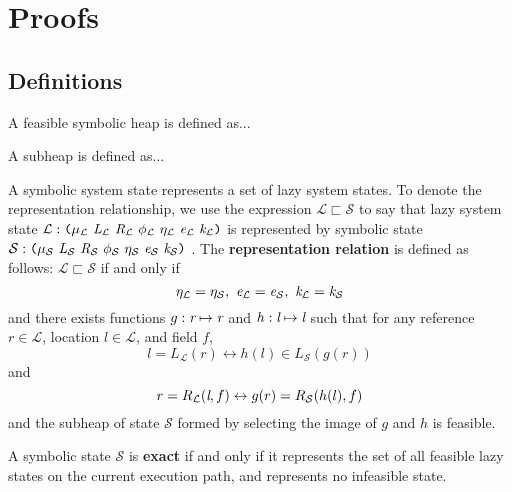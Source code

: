 \section{Proofs}

\subsection{Definitions}

\begin{definition}
A feasible symbolic heap is defined as...
\end{definition}

\begin{definition}
A subheap is defined as...
\end{definition}

\begin{definition}
A symbolic system state represents a set of lazy system states. To denote the representation relationship, we use the expression $\mathcal{L}\sqsubset \mathcal{S} $ to say that lazy system state $\mathcal{L}:\lp \mu_{\mathcal{L}}\ \cfgnt{L}_{\mathcal{L}}\ \cfgnt{R}_{\mathcal{L}}\ \phi_{\mathcal{L}}\ \eta_{\mathcal{L}}\ \cfgnt{e}_{\mathcal{L}}\ \cfgnt{k}_{\mathcal{L}}\rp$ is represented by symbolic state $\mathcal{S}:\lp \mu_{\mathcal{S}}\ \cfgnt{L}_{\mathcal{S}}\ \cfgnt{R}_{\mathcal{S}}\ \phi_{\mathcal{S}}\ \eta_{\mathcal{S}}\ \cfgnt{e}_{\mathcal{S}}\ \cfgnt{k}_{\mathcal{S}}\rp$ . The \textbf{representation relation} is defined as follows: $\mathcal{L}\sqsubset \mathcal{S} $ if and only if 
$$\eta_{\mathcal{L}} = \eta_{\mathcal{S}} ,\ \emph{e}_{\mathcal{L}} = \emph{e}_{\mathcal{S}} ,\ \emph{k}_{\mathcal{L}} = \emph{k}_{\mathcal{S}}$$
and there exists functions $g:\emph{r} \mapsto \emph{r}$ and $h:\emph{l} \mapsto \emph{l}$ such that for any reference $r \in \mathcal{L}$, location $l \in \mathcal{L}$, and field $f$, $$ l = L_{\mathcal{L}}(r) \leftrightarrow h(l)\in L_{\mathcal{S}}(g(r))$$ and $$ r = R_{\mathcal{L}}(\emph{l},f) \leftrightarrow g(r) = R_{\mathcal{S}}(h(l),f)$$ and the subheap of state $\mathcal{S}$ formed by selecting the image of $g$ and $h$ is feasible.

\end{definition}

\begin{definition}
A symbolic state $\mathcal{S}$ is \textbf{exact} if and only if it represents the set of all feasible lazy states on the current execution path, and represents no infeasible state.
\end{definition}


